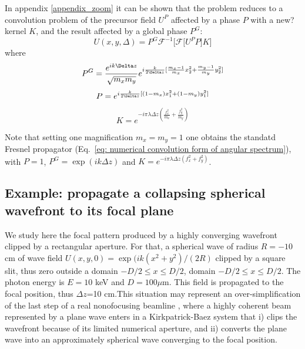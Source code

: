 \documentclass{iucr}              %
\newcommand{\inred}[1]{{\color{red}#1}}
\begin{document}
In appendix \ref{appendix_zoom} it can be shown that the problem reduces to a convolution problem of the precursor field $U^P$ affected by a phase $P$ with a \inred{new?} kernel $K$, and the result affected by a global phase $P^G$: 
\begin{equation}
U(x, y, \Delta) = P^G \mathcal{F}^{-1}\Big[\mathcal{F}\big[U^P P \big] K \Big]
\end{equation}
where
\begin{equation}
P^G =  \frac { e^{ik\Delta z }}{\sqrt{m_x m_y} }e^{i \frac{k}{2 \Delta z} [\frac{m_x - 1}{m_x}x_2^2 + \frac{m_y - 1}{m_y}y_2^2]}  \\
\end{equation}
\begin{equation}
P = e^{i \frac{k}{2 \Delta z} [(1-m_x)x_1^2 + (1-m_y)y_1^2]} \\
\end{equation}
\begin{equation}
K = e^{-i \pi \lambda \Delta z (\frac{f_x^2}{m_x} +\frac{f_y^2}{m_y})}
\end{equation}

Note that setting one magnification $m_x=m_y=1$ one obtains the standatd Fresnel propagator (Eq.~\ref{eq: numerical convolution form of angular spectrum}), with  $P=1$, $P^G=\exp(i k \Delta z)$  and $K= e^{-i \pi \lambda \Delta z (f_x^2 +f_y^2)}$.


\subsection{Example: propagate a collapsing spherical wavefront to its focal plane}
\label{subch: aperture converging}

We study here the focal pattern produced by a highly converging wavefront clipped by a rectangular aperture. For that, a spherical wave of radius $R=-10$ cm of wave field $U(x,y,0) = \exp(i k (x^2 + y^2) / (2 R)$ clipped by a square slit, thus  zero outside a domain $-D/2\le x\le D/2$, domain $-D/2\le x\le D/2$. The photon energy is $E=10$ keV and $D=100 \mu$m. 
This field is propagated to the focal position, thus $\Delta z$=10 cm.This situation may represent an over-simplification of the last step of a real nonofocusing beamline \cite{ID16A}, where a highly coherent beam represented by a plane wave enters in a  Kirkpatrick-Baez system that i) clips the wavefront because of its limited numerical aperture, and ii) converts the plane wave into an approximately spherical wave converging to the focal position.
\end{document}
